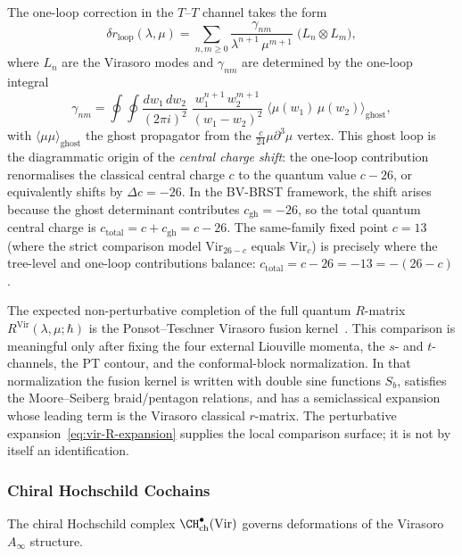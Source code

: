 The one-loop correction in the $T$--$T$ channel takes the form
\begin{equation}
\label{eq:vir-delta-r-loop}
\delta r_{\text{loop}}(\lambda,\mu)
= \sum_{n,m \ge 0}
 \frac{\gamma_{nm}}{\lambda^{n+1}\,\mu^{m+1}}
 \;\bigl(L_n \otimes L_m\bigr),
\end{equation}
where $L_n$ are the Virasoro modes and $\gamma_{nm}$ are determined
by the one-loop integral
\[
\gamma_{nm}
= \oint \oint
 \frac{dw_1\, dw_2}{(2\pi i)^2}\;
 \frac{w_1^{n+1}\, w_2^{m+1}}{(w_1 - w_2)^2}
 \;\langle \mu(w_1)\, \mu(w_2) \rangle_{\text{ghost}},
\]
with $\langle \mu \mu \rangle_{\text{ghost}}$ the ghost propagator
from the $\tfrac{c}{24}\mu\partial^3\mu$ vertex. This ghost loop
is the diagrammatic origin of the \emph{central charge shift}:
the one-loop contribution renormalises the classical central charge
$c$ to the quantum value $c - 26$, or equivalently shifts by
$\Delta c = -26$. In the BV-BRST framework, the shift arises
because the ghost determinant contributes $c_{\text{gh}} = -26$,
so the total quantum central charge is $c_{\text{total}} = c + c_{\text{gh}} = c - 26$.
The same-family fixed point $c = 13$ (where the strict comparison
model $\mathrm{Vir}_{26-c}$ equals $\mathrm{Vir}_c$)
is precisely where the tree-level and one-loop contributions balance:
$c_{\text{total}} = c - 26 = -13 = -(26 - c)$.

\begin{remark}
\label{rem:vir-fusion-kernel}
The expected non-perturbative completion of the full quantum
$R$-matrix $R^{\text{Vir}}(\lambda,\mu;\hbar)$ is the
Ponsot--Teschner Virasoro fusion kernel~\cite{PT01}. This comparison
is meaningful only after fixing the four external Liouville momenta,
the $s$- and $t$-channels, the PT contour, and the conformal-block
normalization. In that normalization the fusion kernel is written with
double sine functions $S_b$, satisfies the Moore--Seiberg
braid/pentagon relations, and has a semiclassical expansion whose
leading term is the Virasoro classical $r$-matrix. The perturbative
expansion~\eqref{eq:vir-R-expansion} supplies the local comparison
surface; it is not by itself an identification.
\end{remark}

\subsubsection{Chiral Hochschild Cochains}

The chiral Hochschild complex $\CH^\bullet_{\text{ch}}(\text{Vir})$ governs deformations of the Virasoro $A_\infty$ structure.

